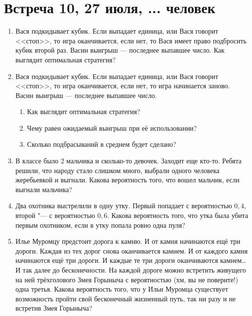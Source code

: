 \documentclass[pdftex,12pt,a4paper]{article}
\begin{document}
\newpage
\section{Встреча 10, 27 июля, ... человек}

\begin{enumerate}
\item Вася подкидывает кубик. Если выпадает единица, или Вася говорит
<<стоп>>, то игра оканчивается, если нет, то Вася имеет право подбросить кубик второй раз. Васин выигрыш --- последнее выпавшее число. Как выглядит оптимальная
стратегия?

\item Вася подкидывает кубик. Если выпадает единица, или Вася говорит
<<стоп>>, то игра оканчивается, если нет, то игра начинается заново. Васин выигрыш --- последнее выпавшее число.
\begin{enumerate}
\item Как выглядит оптимальная стратегия?
\item Чему равен ожидаемый выигрыш при её использовании?
\item Сколько подбрасываний в среднем будет сделано?  
\end{enumerate}
   

\item В классе было 2 мальчика и сколько-то девочек. Заходит еще кто-то. Ребята решили, что народу стало слишком много, выбрали одного человека жеребьевкой и выгнали. Какова вероятность того, что вошел мальчик, если выгнали мальчика?

\item Два охотника выстрелили в одну утку. Первый попадает с
вероятностью $0{,}4$, второй "--- с вероятностью $0{,}6$. Какова вероятность того, что утка была убита первым
охотником, если в утку попала ровно
одна пуля?

\item Илье Муромцу предстоит дорога к камню. И от камня начинаются ещё три дороги. Каждая из тех дорог снова оканчивается камнем. И от каждого камня начинаются ещё три дороги. И каждые те три дороги оканчиваются камнем\ldots И так далее до бесконечности. На каждой дороге можно встретить живущего на ней трёхголового Змея Горыныча с вероятностью (хм, вы не поверите!) одна третья. Какова вероятность того, что у Ильи Муромца существует возможность пройти свой бесконечный жизненный путь, так ни разу и не встретив Змея Горыныча?

\end{enumerate}
\end{document}
